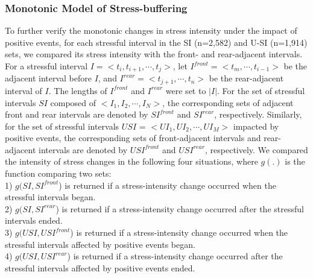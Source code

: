 \subsubsection{Monotonic Model of Stress-buffering}
\label{sec:mono}
To further verify the monotonic changes in stress intensity under the impact of positive events,
for each stressful interval in the SI (n=2,582) and U-SI (n=1,914) sets,
we compared its stress intensity with the front- and rear-adjacent intervals. 
For a stressful interval $I = <t_i,t_{i+1},\cdots,t_j>$,
let $I^{front} = <t_m,\cdots,t_{i-1}>$ be the adjacent interval before $I$,
and $I^{rear} = <t_{j+1},\cdots,t_n>$ be the rear-adjacent interval of $I$.
The lengths of $I^{front}$ and $I^{rear}$ were set to $|I|$.
For the set of stressful intervals $SI$ composed of $<I_1,I_2,\cdots,I_N>$,
the corresponding sets of adjacent front and rear intervals are denoted by $SI^{front}$ and $SI^{rear}$, respectively. 
Similarly, for the set of stressful intervals $USI$ = $<UI_1,UI_2,\cdots, UI_M>$ impacted by positive events,
the corresponding sets of front-adjacent intervals and rear-adjacent intervals are denoted by $USI^{front}$ and $USI^{rear}$, respectively. 
We compared the intensity of stress changes in the following four situations,
where $g(.)$ is the function comparing two sets: \\
1) $g(SI,SI^{front}$)   is returned if a stress-intensity change occurred when the stressful intervals began.\\ 
2) $g(SI,SI^{rear}$)    is returned if a stress-intensity change occurred after the stressful intervals ended.\\ 
3) $g(USI,USI^{front}$) is returned if a stress-intensity change occurred when the stressful intervals affected by positive events began.\\ 
4) $g(USI,USI^{rear}$)  is returned if a stress-intensity change occurred after the stressful intervals affected by positive events ended.

